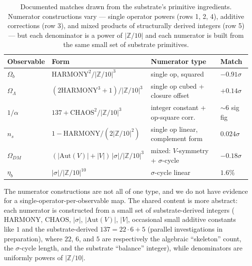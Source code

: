 \documentclass[11pt,reqno]{amsart}
\theoremstyle{plain}
\theoremstyle{definition}
\theoremstyle{remark}
\newcommand{\Z}{\mathbb{Z}}
\newcommand{\Aut}{\mathrm{Aut}}
\begin{document}
\begin{table}[h]
\centering
\caption{Documented matches drawn from the substrate's primitive
ingredients. Numerator constructions vary --- single operator
powers (rows 1, 2, 4), additive corrections (row 3), and mixed
products of structurally derived integers (row 5) --- but each
denominator is a power of $|\Z/10|$ and each numerator is built
from the same small set of substrate primitives.}
\label{tab:operator-observable}
\begin{tabular}{llll}
\toprule
Observable        & Form                                                  & Numerator type                       & Match \\
\midrule
$\Omega_b$        & $\mathrm{HARMONY}^{2}/|\Z/10|^{3}$                    & single op, squared                   & $-0.91\sigma$ \\
$\Omega_\Lambda$  & $(2\mathrm{HARMONY}^{3} + 1)/|\Z/10|^{3}$             & single op cubed + closure offset     & $+0.14\sigma$ \\
$1/\alpha$        & $137 + \mathrm{CHAOS}^{2}/|\Z/10|^{3}$                & integer constant + op-square corr.   & $\sim 6$ sig fig \\
$n_s$             & $1 - \mathrm{HARMONY}/(2|\Z/10|^{2})$                 & single op linear, complement form    & $0.024\sigma$ \\
$\Omega_{DM}$     & $(|\Aut(V)| + |V|)\,|\sigma|/|\Z/10|^{3}$             & mixed: $V$-symmetry + $\sigma$-cycle & $-0.18\sigma$ \\
$\eta_b$          & $|\sigma|/|\Z/10|^{10}$                                & $\sigma$-cycle linear                & $1.6\%$ \\
\bottomrule
\end{tabular}
\end{table}

The numerator constructions are not all of one type, and we do
not have evidence for a single-operator-per-observable map. The
shared content is more abstract: each numerator is constructed
from a small set of substrate-derived integers
($\mathrm{HARMONY}$, $\mathrm{CHAOS}$, $|\sigma|$, $|\Aut(V)|$,
$|V|$, occasional small additive constants like $1$ and the
substrate-derived $137 = 22 \cdot 6 + 5$ (parallel investigations
in preparation), where $22$, $6$, and $5$ are
respectively the algebraic ``skeleton'' count, the
$\sigma$-cycle length, and the substrate ``balance'' integer),
while denominators are uniformly powers of $|\Z/10|$.
\end{document}
